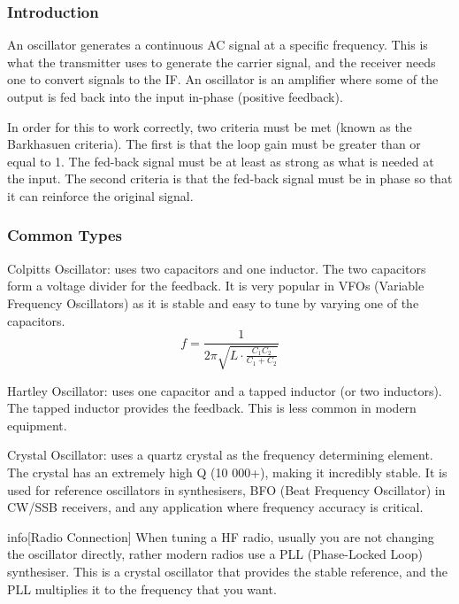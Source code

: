 \documentclass{article}
\begin{document}
\subsubsection{Introduction}
An oscillator generates a continuous AC signal at a specific frequency. This is what the transmitter uses to generate the carrier signal, and the receiver needs one to convert signals to the IF. An oscillator is an amplifier where some of the output is fed back into the input in-phase (positive feedback).

In order for this to work correctly, two criteria must be met (known as the Barkhasuen criteria). The first is that the loop gain must be greater than or equal to 1. The fed-back signal must be at least as strong as what is needed at the input. The second criteria is that the fed-back signal must be in phase so that it can reinforce the original signal.

\subsubsection{Common Types}
Colpitts Oscillator: uses two capacitors and one inductor. The two capacitors form a voltage divider for the feedback. It is very popular in VFOs (Variable Frequency Oscillators) as it is stable and easy to tune by varying one of the capacitors.
\[
    f=\frac{1}{2\pi \sqrt{L\cdot \frac{C_1C_2}{C_1+C_2}}}
\]

Hartley Oscillator: uses one capacitor and a tapped inductor (or two inductors). The tapped inductor provides the feedback. This is less common in modern equipment.

Crystal Oscillator: uses a quartz crystal as the frequency determining element. The crystal has an extremely high Q (10 000+), making it incredibly stable. It is used for reference oscillators in synthesisers, BFO (Beat Frequency Oscillator) in CW/SSB receivers, and any application where frequency accuracy is critical.
\begin{callout}{info}[Radio Connection]
    When tuning a HF radio, usually you are not changing the oscillator directly, rather modern radios use a PLL (Phase-Locked Loop) synthesiser. This is a crystal oscillator that provides the stable reference, and the PLL multiplies it to the frequency that you want.
\end{callout}
\end{document}
